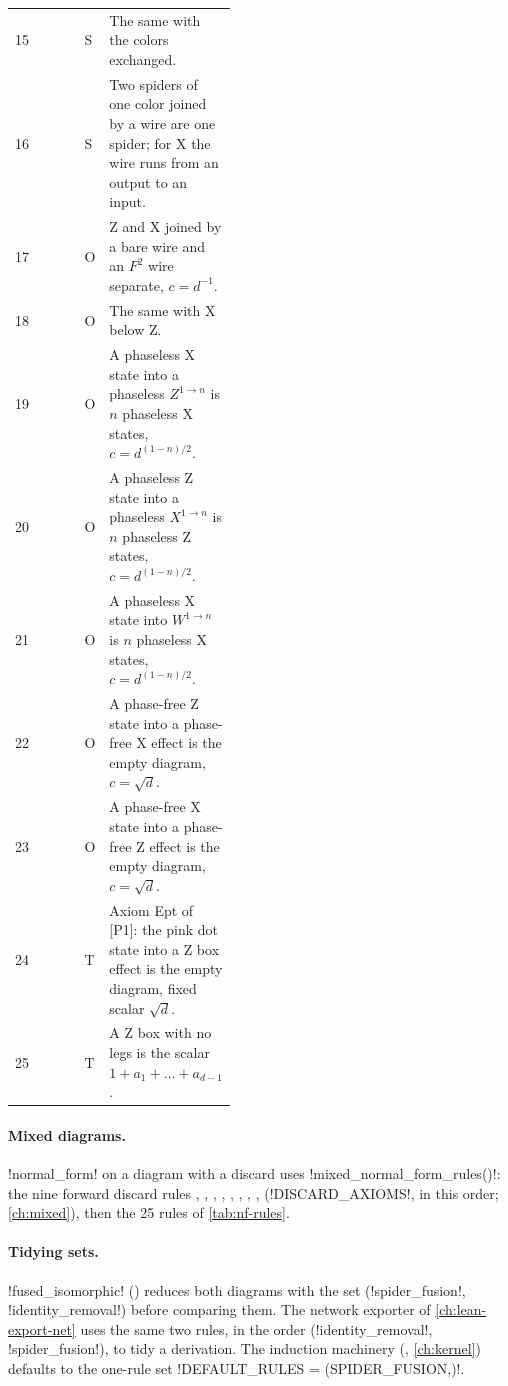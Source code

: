 \begin{xltabular}{\linewidth}{@{}r>{\raggedright\arraybackslash}p{0.33\linewidth}>{\raggedright\arraybackslash}p{0.11\linewidth}>{\raggedright\arraybackslash}X@{}}
15 &  & S & The same with the colors exchanged. \\
16 &  & S & Two spiders of one color joined by a wire are one spider; for X the wire runs from an output to an input. \\
17 &  & O & Z and X joined by a bare wire and an $F^2$ wire separate, $c=d^{-1}$. \\
18 &  & O & The same with X below Z. \\
19 &  & O & A phaseless X state into a phaseless $Z^{1\to n}$ is $n$ phaseless X states, $c=d^{(1-n)/2}$. \\
20 &  & O & A phaseless Z state into a phaseless $X^{1\to n}$ is $n$ phaseless Z states, $c=d^{(1-n)/2}$. \\
21 &  & O & A phaseless X state into $W^{1\to n}$ is $n$ phaseless X states, $c=d^{(1-n)/2}$. \\
22 &  & O & A phase-free Z state into a phase-free X effect is the empty diagram, $c=\sqrt d$. \\
23 &  & O & A phase-free X state into a phase-free Z effect is the empty diagram, $c=\sqrt d$. \\
24 &  & T & Axiom Ept of [P1]: the pink dot state into a Z box effect is the empty diagram, fixed scalar $\sqrt d$. \\
25 &  & T & A Z box with no legs is the scalar $1+a_1+\dots+a_{d-1}$. \\
\end{xltabular}

\paragraph{Mixed diagrams.} \py!normal_form! on a diagram with a discard uses \py!mixed_normal_form_rules()!: the nine forward discard rules , , , , , , , ,  (\py!DISCARD_AXIOMS!, in this order; \cref{ch:mixed}), then the 25 rules of \cref{tab:nf-rules}.

\paragraph{Tidying sets.} \py!fused_isomorphic! () reduces both diagrams with the set (\azx!spider_fusion!, \azx!identity_removal!) before comparing them. The network exporter of \cref{ch:lean-export-net} uses the same two rules, in the order (\azx!identity_removal!, \azx!spider_fusion!), to tidy a derivation. The induction machinery (, \cref{ch:kernel}) defaults to the one-rule set \py!DEFAULT_RULES = (SPIDER_FUSION,)!.

